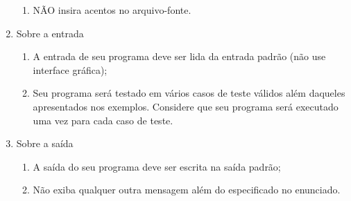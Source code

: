 \begin{enumerate}
\begin{enumerate}
  \item NÃO insira acentos no arquivo-fonte.
  \end{enumerate}
\item Sobre a entrada
  \begin{enumerate}
  \item A entrada de seu programa deve ser lida da entrada padrão (não use interface gráfica);
  \item Seu programa será testado em vários casos de teste válidos além daqueles apresentados nos exemplos. Considere que seu programa será executado uma vez para cada caso de teste.
  \end{enumerate}
\item Sobre a saída
  \begin{enumerate}
  \item A saída do seu programa deve ser escrita na saída padrão;
  \item Não exiba qualquer outra mensagem além do especificado no enunciado.
  \end{enumerate}
\end{enumerate}